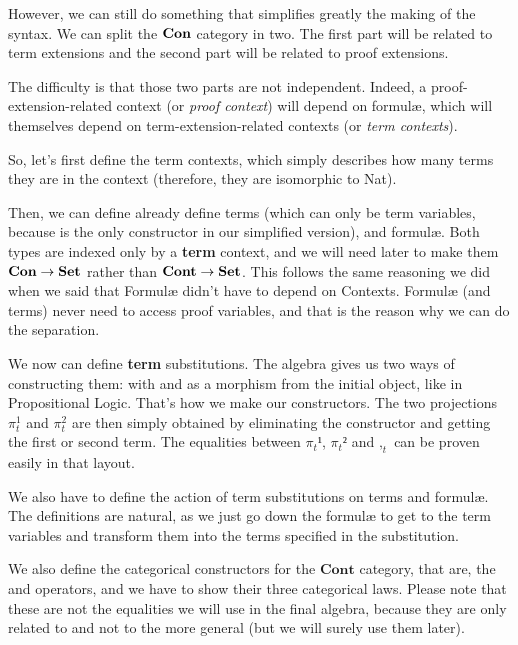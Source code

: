 \documentclass[10pt,a4paper]{article}
\begin{document}
			However, we can still do something that simplifies greatly the making of the syntax. We can split the $\textbf{Con}$ category in two. The first part will be related to term extensions and the second part will be related to proof extensions.
			
			The difficulty is that those two parts are not independent. Indeed, a proof-extension-related context (or \emph{proof context}) will depend on formulæ, which will themselves depend on term-extension-related contexts (or \emph{term contexts}).
		
			So, let's first define the term contexts, which simply describes how many terms they are in the context (therefore, they are isomorphic to Nat).
			
			\begin{tcolorbox}
			\end{tcolorbox}
		
			Then, we can define already define terms (which can only be term variables, because  is the only constructor in our simplified version), and formulæ. Both types are indexed only by a \textbf{term} context, and we will need later to make them $\textbf{Con} \rightarrow \textbf{Set}$ rather than $\textbf{Cont} \rightarrow \textbf{Set}$. This follows the same reasoning we did when we said that Formulæ didn't have to depend on Contexts. Formulæ (and terms) never need to access proof variables, and that is the reason why we can do the separation.
			
			\begin{tcolorbox}
				\agda{agda/FFOL-I-3.tex}
				\agdasep
				\agda{agda/FFOL-I-4.tex}
			\end{tcolorbox}
		
			We now can define \textbf{term} substitutions. The algebra gives us two ways of constructing them: with  and as a morphism from the initial object, like in Propositional Logic. That's how we make our constructors. The two projections $\pi_t^1$ and $\pi_t^2$ are then simply obtained by eliminating the  constructor and getting the first or second term. The equalities between $\pi_t¹$, $\pi_t²$ and $,_t$ can be proven easily in that layout.
			
			We also have to define the action of term substitutions on terms and formulæ. The definitions are natural, as we just go down the formulæ to get to the term variables and transform them into the terms specified in the substitution.
			
			We also define the categorical constructors for the $\textbf{Cont}$ category, that are, the  and  operators, and we have to show their three categorical laws. Please note that these are not the equalities we will use in the final algebra, because they are only related to  and not to the more general  (but we will surely use them later).
		
\end{document}

